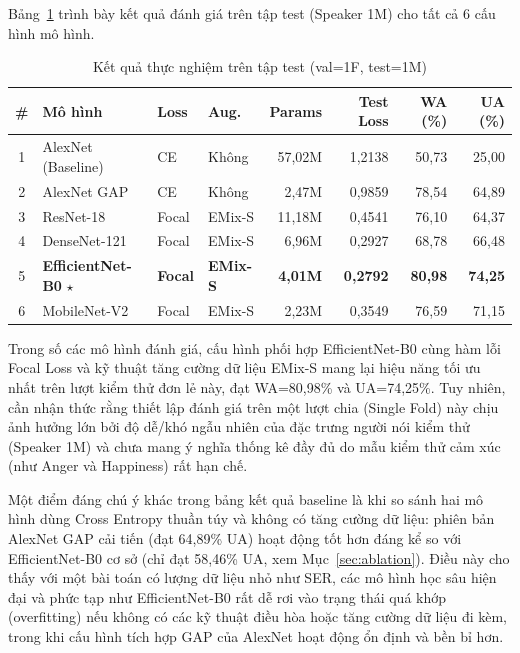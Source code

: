 Bảng~\ref{tab:main_results} trình bày kết quả đánh giá trên tập test (Speaker 1M) cho tất cả 6 cấu hình mô hình. 

\begin{table}[H]
\centering
\setlength{\tabcolsep}{4.5pt}
\caption{Kết quả thực nghiệm trên tập test (val=1F, test=1M)}
\label{tab:main_results}
\begin{tabular}{clllrrrr}
\toprule
\textbf{\#} & \textbf{Mô hình} & \textbf{Loss} & \textbf{Aug.} & \textbf{Params} & \textbf{Test Loss} & \textbf{WA (\%)} & \textbf{UA (\%)} \\
\midrule
1 & AlexNet (Baseline) & CE & Không & 57,02M & 1,2138 & 50,73 & 25,00 \\
2 & AlexNet GAP & CE & Không & 2,47M & 0,9859 & 78,54 & 64,89 \\
3 & ResNet-18 & Focal & EMix-S & 11,18M & 0,4541 & 76,10 & 64,37 \\
4 & DenseNet-121 & Focal & EMix-S & 6,96M & 0,2927 & 68,78 & 66,48 \\
5 & \textbf{EfficientNet-B0} $\star$ & \textbf{Focal} & \textbf{EMix-S} & \textbf{4,01M} & \textbf{0,2792} & \textbf{80,98} & \textbf{74,25} \\
6 & MobileNet-V2 & Focal & EMix-S & 2,23M & 0,3549 & 76,59 & 71,15 \\
\bottomrule
\end{tabular}
\end{table}

Trong số các mô hình đánh giá, cấu hình phối hợp EfficientNet-B0 cùng hàm lỗi Focal Loss và kỹ thuật tăng cường dữ liệu EMix-S mang lại hiệu năng tối ưu nhất trên lượt kiểm thử đơn lẻ này, đạt WA=80,98\% và UA=74,25\%. Tuy nhiên, cần nhận thức rằng thiết lập đánh giá trên một lượt chia (Single Fold) này chịu ảnh hưởng lớn bởi độ dễ/khó ngẫu nhiên của đặc trưng người nói kiểm thử (Speaker 1M) và chưa mang ý nghĩa thống kê đầy đủ do mẫu kiểm thử cảm xúc (như Anger và Happiness) rất hạn chế.

Một điểm đáng chú ý khác trong bảng kết quả baseline là khi so sánh hai mô hình dùng Cross Entropy thuần túy và không có tăng cường dữ liệu: phiên bản AlexNet GAP cải tiến (đạt 64,89\% UA) hoạt động tốt hơn đáng kể so với EfficientNet-B0 cơ sở (chỉ đạt 58,46\% UA, xem Mục~\ref{sec:ablation}). Điều này cho thấy với một bài toán có lượng dữ liệu nhỏ như SER, các mô hình học sâu hiện đại và phức tạp như EfficientNet-B0 rất dễ rơi vào trạng thái quá khớp (overfitting) nếu không có các kỹ thuật điều hòa hoặc tăng cường dữ liệu đi kèm, trong khi cấu hình tích hợp GAP của AlexNet hoạt động ổn định và bền bỉ hơn.

